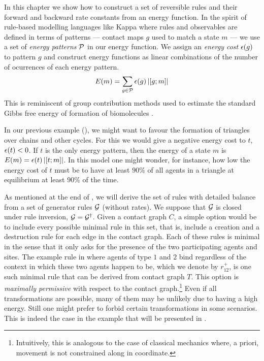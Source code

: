 In this chapter we show how to construct a set of reversible rules
and their forward and backward rate constants from an energy function.
In the spirit of rule-based modelling languages like Kappa
where rules and observables are defined in terms of patterns ---
contact maps $g$ used to match a state $m$ ---
we use a set of \emph{energy patterns} $\mathcal{P}$
in our energy function.
We assign an \emph{energy cost} $\epsilon(g)$ to pattern $g$
and construct energy functions as linear combinations
of the number of ocurrences of each energy pattern.
\[ E(m) = \sum_{g \in \mathcal{P}} \epsilon(g) \left\lvert \left[g;m\right] \right\rvert \]
This is reminiscent of group contribution methods
used to estimate the standard Gibbs free energy of formation
of biomolecules \citep{group-contrib}.

In our previous example (), we might want to favour
the formation of triangles over chains and other cycles.
For this we would give a negative energy cost to $t$,
\ie $\epsilon(t) < 0$.
If $t$ is the only energy pattern,
then the energy of a state $m$ is
$E(m) = \epsilon(t) \left\lvert \left[t;m\right] \right\rvert$.
In this model one might wonder, for instance,
how low the energy cost of $t$ must be
to have at least $90\%$ of all agents in a triangle
at equilibrium at least $90\%$ of the time.

As mentioned at the end of ,
we will derive the set of rules with detailed balance
from a set of generator rules $\mathcal{G}$ (without rates).
We suppose that $\mathcal{G}$ is closed under
rule inversion, \ie $\mathcal{G} = \mathcal{G}^\dagger$.
Given a contact graph $C$,
a simple option would be to include
every possible minimal rule in this set,
that is, include a creation and a destruction rule
for each edge in the contact graph.
Each of these rules is minimal in the sense that
it only asks for the presence of
the two participating agents and sites.
The example rule in 
where agents of type $1$ and $2$ bind
regardless of the context
in which these two agents happen to be,
which we denote by $r^+_{12}$,
is one such minimal rule
that can be derived from contact graph $T$.
This option is \emph{maximally permissive}
with respect to the contact graph.\footnote{
  Intuitively, this is analogous to the case of classical mechanics
  where, a priori, movement is not constrained along in coordinate.}
Even if all transformations are possible,
many of them may be unlikely due to having a high energy.
Still one might prefer to forbid certain transformations
in some scenarios.
This is indeed the case in the example
that will be presented in .


